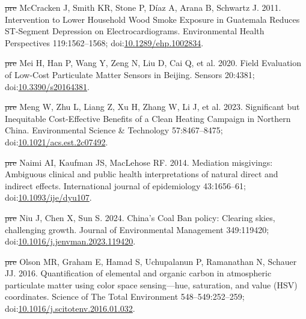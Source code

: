 \documentclass[
  letterpaper,
  DIV=11,
  numbers=noendperiod]{scrartcl}
\newlength{\cslhangindent}
\newenvironment{CSLReferences}[2] %
 {\begin{list}{}{%
  \setlength{\itemindent}{0pt} %
  \setlength{\leftmargin}{0pt} %
  \setlength{\parsep}{0pt} %
  \ifodd #1
   \setlength{\leftmargin}{\cslhangindent} %
   \setlength{\itemindent}{-1\cslhangindent} %
  \fi
  \setlength{\itemsep}{#2\baselineskip}}} %
 {\end{list}} %
\providecommand{\DIFdel}[1]{{\protect\color{red}\sout{#1}}}                      %
\providecommand{\DIFaddbegin}{} %
\providecommand{\DIFaddend}{} %
\providecommand{\DIFdelbegin}{} %
\providecommand{\DIFdelend}{} %
\newcommand{\DIFscaledelfig}{0.5}
\newlength{\DIFdelgraphicswidth} %
\newlength{\DIFdelgraphicsheight} %
\newcommand{\DIFaddincludegraphics}[2][]{{\color{blue}\fbox{\DIFOincludegraphics[#1]{#2}}}} %
\newcommand{\DIFdelincludegraphics}[2][]{%
\sbox{\DIFdelgraphicsbox}{\DIFOincludegraphics[#1]{#2}}%
\settoboxwidth{\DIFdelgraphicswidth}{\DIFdelgraphicsbox} %
\settoboxtotalheight{\DIFdelgraphicsheight}{\DIFdelgraphicsbox} %
\scalebox{\DIFscaledelfig}{%
\parbox[b]{\DIFdelgraphicswidth}{\usebox{\DIFdelgraphicsbox}\\[-\baselineskip] \rule{\DIFdelgraphicswidth}{0em}}\llap{\resizebox{\DIFdelgraphicswidth}{\DIFdelgraphicsheight}{%
\setlength{\unitlength}{\DIFdelgraphicswidth}%
\begin{picture}(1,1)%
\thicklines\linethickness{2pt} %
{\color[rgb]{1,0,0}\put(0,0){\framebox(1,1){}}}%
{\color[rgb]{1,0,0}\put(0,0){\line( 1,1){1}}}%
{\color[rgb]{1,0,0}\put(0,1){\line(1,-1){1}}}%
\end{picture}%
}\hspace*{3pt}}} %
} %
\DeclareRobustCommand{\DIFaddbegin}{\DIFOaddbegin \let\includegraphics\DIFaddincludegraphics} %
\DeclareRobustCommand{\DIFaddend}{\DIFOaddend \let\includegraphics\DIFOincludegraphics} %
\DeclareRobustCommand{\DIFdelbegin}{\DIFOdelbegin \let\includegraphics\DIFdelincludegraphics} %
\DeclareRobustCommand{\DIFdelend}{\DIFOaddend \let\includegraphics\DIFOincludegraphics} %
\begin{document}
\begin{CSLReferences}{1}{1}
\DIFdelbegin %
\DIFdel{pre}%
\DIFdelend \DIFaddbegin {}
\DIFaddend McCracken J, Smith KR, Stone P, Díaz A, Arana B, Schwartz J. 2011.
Intervention to {Lower Household Wood Smoke Exposure} in {Guatemala
Reduces ST-Segment Depression} on {Electrocardiograms}. Environmental
Health Perspectives 119:1562--1568;
doi:\href{https://doi.org/10.1289/ehp.1002834}{10.1289/ehp.1002834}.

\DIFdelbegin %
\DIFdel{pre}%
\DIFdelend \DIFaddbegin {}
\DIFaddend Mei H, Han P, Wang Y, Zeng N, Liu D, Cai Q, et al. 2020. Field
{Evaluation} of {Low-Cost Particulate Matter Sensors} in {Beijing}.
Sensors 20:4381;
doi:\href{https://doi.org/10.3390/s20164381}{10.3390/s20164381}.

\DIFdelbegin %
\DIFdel{pre}%
\DIFdelend \DIFaddbegin {}
\DIFaddend Meng W, Zhu L, Liang Z, Xu H, Zhang W, Li J, et al. 2023. Significant
but {Inequitable Cost-Effective Benefits} of a {Clean Heating Campaign}
in {Northern China}. Environmental Science \& Technology 57:8467--8475;
doi:\href{https://doi.org/10.1021/acs.est.2c07492}{10.1021/acs.est.2c07492}.

\DIFdelbegin %
\DIFdel{pre}%
\DIFdelend \DIFaddbegin {}
\DIFaddend Naimi AI, Kaufman JS, MacLehose RF. 2014. Mediation misgivings:
Ambiguous clinical and public health interpretations of natural direct
and indirect effects. International journal of epidemiology 43:1656--61;
doi:\href{https://doi.org/10.1093/ije/dyu107}{10.1093/ije/dyu107}.

\DIFdelbegin %
\DIFdel{pre}%
\DIFdelend \DIFaddbegin {}
\DIFaddend Niu J, Chen X, Sun S. 2024. China's {Coal Ban} policy: {Clearing} skies,
challenging growth. Journal of Environmental Management 349:119420;
doi:\href{https://doi.org/10.1016/j.jenvman.2023.119420}{10.1016/j.jenvman.2023.119420}.

\DIFdelbegin %
\DIFdel{pre}%
\DIFdelend \DIFaddbegin {}
\DIFaddend Olson MR, Graham E, Hamad S, Uchupalanun P, Ramanathan N, Schauer JJ.
2016. Quantification of elemental and organic carbon in atmospheric
particulate matter using color space sensing---hue, saturation, and
value ({HSV}) coordinates. Science of The Total Environment
548--549:252--259;
doi:\href{https://doi.org/10.1016/j.scitotenv.2016.01.032}{10.1016/j.scitotenv.2016.01.032}.


\end{CSLReferences}
\end{document}
